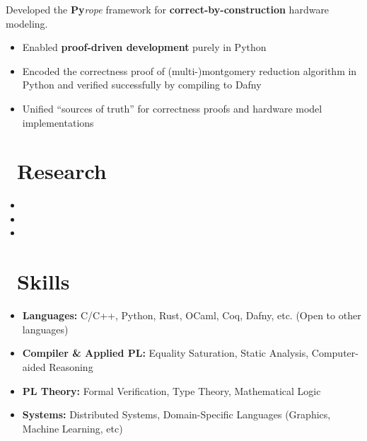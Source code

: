 \documentclass{resume}
\begin{document}
Developed the \textbf{Py}\textit{rope} framework for \textbf{correct-by-construction} hardware modeling.
\begin{itemize}
  \item Enabled \textbf{proof-driven development} purely in Python
  \item Encoded the correctness proof of (multi-)montgomery reduction algorithm in Python and verified successfully by compiling to Dafny
  \item Unified ``sources of truth'' for correctness proofs and hardware model implementations
\end{itemize}

\section{\faLeanpub\ Research}
\begin{itemize}
    \item {}
    \item {}
    \item {}
\end{itemize}

\section{\faCog\ Skills}
\begin{itemize}
    \item \textbf{Languages:} C/C++, Python, Rust, OCaml, Coq, Dafny, etc. (Open to other languages)
    \item \textbf{Compiler \& Applied PL:} Equality Saturation, Static Analysis, Computer-aided Reasoning
    \item \textbf{PL Theory:} Formal Verification, Type Theory, Mathematical Logic
    \item \textbf{Systems:} Distributed Systems, Domain-Specific Languages (Graphics, Machine Learning, etc)
\end{itemize}

\end{document}
